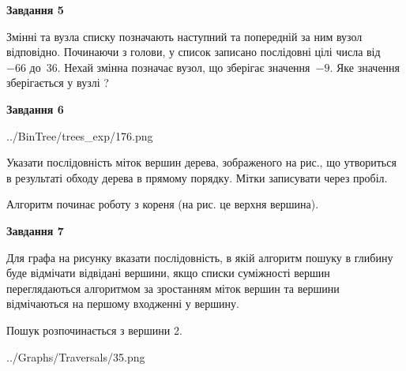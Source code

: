 \documentclass[12pt, ukrainian]{article}
\begin{document}
{\begin {large}
{\begin {center}\textbf{Завдання 5}\end {center}}\par
Змінні  та  вузла списку позначають наступний та попередній за ним вузол відповідно. Починаючи з голови, у список записано послідовні цілі числа від~$-66$ до~$36$. Нехай змінна  позначає вузол, що зберігає значення~$-9$.
Яке значення зберігається у вузлі  ?\par
\newpage

{\begin {center}\textbf{Завдання 6}\end {center}}\par

\begin{center}
	{../BinTree/trees_exp/176.png}
\end{center}
Указати послідовність міток вершин дерева, зображеного на рис., що утвориться в результаті обходу дерева в прямому порядку. Мітки записувати через пробіл.\par Алгоритм починає роботу з кореня (на рис. це верхня вершина).\par
\newpage

{\begin {center}\textbf{Завдання 7}\end {center}}\par
Для графа на рисунку вказати послідовність, в якій алгоритм пошуку в глибину буде відмічати відвідані вершини, якщо списки суміжності вершин переглядаються алгоритмом за зростанням міток вершин та вершини відмічаються на першому вход\-женні у вершину.\par
Пошук розпочинається з вершини 2.\par

\begin{center}
	{../Graphs/Traversals/35.png}
\end{center}\par
\newpage


\end{large}}
\end{document}
